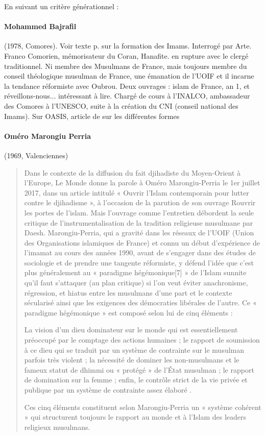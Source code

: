 En suivant un critère générationnel : 
\paragraph{Mohammed Bajrafil} (1978, Comores). Voir texte  p. \pageref{Theo:Bajrafil1} sur la formation des Imams. Interrogé par Arte. Franco Comorien, mémorisateur du Coran, Hanafite. en rupture avec le clergé traditionnel. Ni membre des Musulmans de France, mais toujours membre du conseil théologique musulman de France, une émanation de l'UOIF et il incarne la tendance réformiste avec Oubrou. Deux ouvrages : islam de France, an 1, et réveillons-nous... intéressant à lire. Chargé de cours à l'INALCO, ambassadeur des Comores à l'UNESCO, suite à la création du CNI (conseil national des Imams). Sur OASIS, article de \CB sur les différentes formes 
\paragraph{Oméro Marongiu Perria} (1969, Valenciennes)
\begin{quote}
    Dans le contexte de la diffusion du fait djihadiste du Moyen-Orient à l’Europe, Le Monde donne la parole à Oméro Marongiu-Perria le 1er juillet 2017, dans un article intitulé « Ouvrir l’Islam contemporain pour lutter contre le djihadisme », à l’occasion de la parution de son ouvrage Rouvrir les portes de l’islam. Mais l’ouvrage comme l’entretien débordent la seule critique de l’instrumentalisation de la tradition religieuse musulmane par Daesh. Marongiu-Perria, qui a gravité dans les réseaux de l’UOIF (Union des Organisations islamiques de France) et connu un début d’expérience de l’imamat au cours des années 1990, avant de s’engager dans des études de sociologie et de prendre une tangente réformiste, y défend l’idée que c’est plus généralement au « paradigme hégémonique[7] » de l’Islam sunnite qu’il faut s’attaquer (au plan critique) si l’on veut éviter anachronisme, régression, et hiatus entre les musulmans d’une part et le contexte sécularisé ainsi que les exigences des démocraties libérales de l’autre. Ce « paradigme hégémonique » est composé selon lui de cinq éléments :

La vision d’un dieu dominateur sur le monde qui est essentiellement préoccupé par le comptage des actions humaines ; le rapport de soumission à ce dieu qui se traduit par un système de contrainte sur le musulman parfois très violent ; la nécessité de dominer les non-musulmans et le fameux statut de dhimmi ou « protégé » de l’État musulman ; le rapport de domination sur la femme ; enfin, le contrôle strict de la vie privée et publique par un système de contrainte assez élaboré .

Ces cinq éléments constituent selon Marongiu-Perria un « système cohérent » qui structurent toujours le rapport au monde et à l’Islam des leaders religieux musulmans.\cite{Baylocq:reformisteFrance}
\end{quote}
